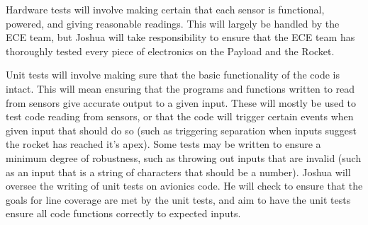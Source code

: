 \documentclass[onecolumn, draftclsnofoot, 10pt, compsoc]{IEEEtran}
\begin{document}
Hardware tests will involve making certain that each sensor is functional, powered, and giving reasonable readings. This will largely be handled by the ECE team, but Joshua will take responsibility to ensure that the ECE team has thoroughly tested every piece of electronics on the Payload and the Rocket. 

Unit tests will involve making sure that the basic functionality of the code is intact. This will mean ensuring that the programs and functions written to read from sensors give accurate output to a given input. These will mostly be used to test code reading from sensors, or that the code will trigger certain events when given input that should do so (such as triggering separation when inputs suggest the rocket has reached it’s apex). Some tests may be written to ensure a minimum degree of robustness, such as throwing out inputs that are invalid (such as an input that is a string of characters that should be a number). Joshua will oversee the writing of unit tests on avionics code. He will check to ensure that the goals for line coverage are met by the unit tests, and aim to have the unit tests ensure all code functions correctly to expected inputs.
\end{document}
